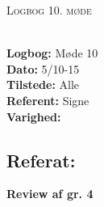 \documentclass[a4paper,11pt,oneside]{memoir}
\begin{document}
\newpage



\begin{center} 
\huge{\textsc{Logbog 10. møde}}
\end{center}

\textbf{ }
\\
\textbf{Logbog:} Møde 10
\\
\textbf{Dato:} 5/10-15
\\
\textbf{Tilstede:} Alle
\\
\textbf{Referent:} Signe
\\
\textbf{Varighed:} 
\\

\subsection{Referat:}
\textbf{Review af gr. 4}
\end{document}

